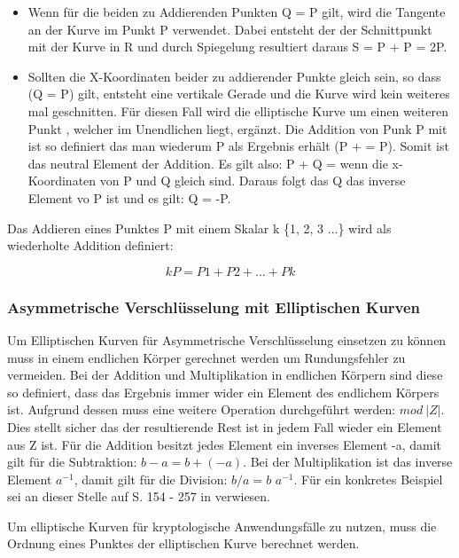 		\begin{itemize}
			\item Wenn für die beiden zu Addierenden Punkten Q = P gilt, wird die Tangente an der Kurve im Punkt P verwendet. Dabei entsteht der der Schnittpunkt mit der Kurve in R und durch Spiegelung resultiert daraus S = P + P = 2P.
			\item Sollten die X-Koordinaten beider zu addierender Punkte gleich sein, so dass (Q = P) gilt, entsteht eine vertikale Gerade und die Kurve wird kein weiteres mal geschnitten. Für diesen Fall wird die elliptische Kurve um einen weiteren Punkt \myInftyOhne, welcher im Unendlichen liegt, ergänzt. Die Addition von Punk P mit \myInfty ist so definiert das man wiederum P als Ergebnis erhält (P + \myInfty = P). Somit ist \myInfty das neutral Element der Addition. Es gilt also: P + Q = \myInfty wenn die x-Koordinaten von P und Q gleich sind. Daraus folgt das Q das inverse Element vo P ist und es gilt: Q = -P.
		\end{itemize}
		
		Das Addieren eines Punktes P mit einem Skalar k \myin \{1, 2, 3 ...\} wird als wiederholte Addition definiert:
		
		\begin{displaymath}
			kP = P1 + P2 + ... + Pk
		\end{displaymath}

		\subsubsection{Asymmetrische Verschlüsselung mit Elliptischen Kurven}
			Um Elliptischen Kurven für Asymmetrische Verschlüsselung einsetzen zu können muss in einem endlichen Körper gerechnet werden um Rundungsfehler zu vermeiden. Bei der Addition und Multiplikation in endlichen Körpern sind diese so definiert, dass das Ergebnis immer wider ein Element des endlichem Körpers ist. Aufgrund dessen muss eine weitere Operation durchgeführt werden: $mod~|Z|$. Dies stellt sicher das der resultierende Rest ist in jedem Fall wieder ein Element aus Z ist. Für die Addition besitzt jedes Element ein inverses Element -a, damit gilt für die Subtraktion: $b - a = b + (-a)$. Bei der Multiplikation ist das inverse Element $a^{-1}$, damit gilt für die Division: $b / a = b$ \mycdot $a^{-1}$. Für ein konkretes Beispiel sei an dieser Stelle auf S. 154 - 257 in \cite{Information:und:Kommunikation} verwiesen.
			
			Um elliptische Kurven für kryptologische Anwendungsfälle zu nutzen, muss die Ordnung eines Punktes der elliptischen Kurve berechnet werden.
			
